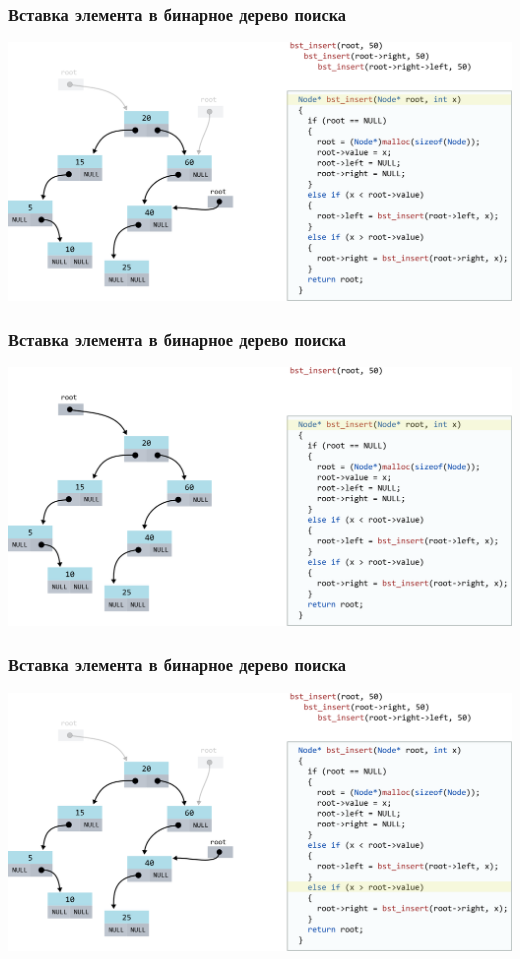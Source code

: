 \documentclass[10pt,pdf,hyperref={unicode}]{beamer}
\begin{document}
\begin{frame}[fragile]
\frametitle{Вставка элемента в бинарное дерево поиска}
\begin{center}
\includegraphics[scale=0.6]{images/tree/codetree/codetree7.png}
\end{center}
\end{frame}
\begin{frame}[fragile]
\frametitle{Вставка элемента в бинарное дерево поиска}
\begin{center}
\includegraphics[scale=0.6]{images/tree/codetree/codetree1.png}
\end{center}
\end{frame}
\begin{frame}[fragile]
\frametitle{Вставка элемента в бинарное дерево поиска}
\begin{center}
\includegraphics[scale=0.6]{images/tree/codetree/codetree8.png}
\end{center}
\end{frame}
\end{document}
